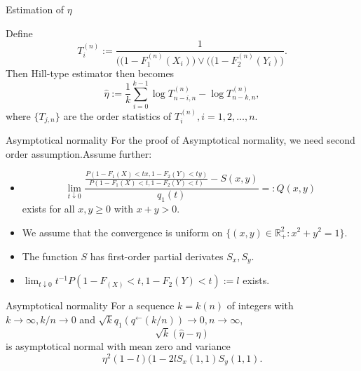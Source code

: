 \documentclass[11pt]{beamer}
\begin{document}
\begin{frame}{Estimation of $\eta$}

Define 
\begin{displaymath}
T_i^{(n)}:=\dfrac{1}{\big( (1-F_1^{(n)}(X_i)\big) \lor \big( (1-F_2^{(n)}(Y_i)\big)}.
\end{displaymath}
Then Hill-type estimator then becomes
\begin{displaymath}
\hat{\eta}:=\frac{1}{k}\sum_{i=0}^{k-1} \log T_{n-i,n}^{(n)}-\log T_{n-k,n}^{(n)},
\end{displaymath}
where $\{T_{j,n}\}$ are the order statistics of $T_i^{(n)}, i=1,2,\dots,n$.
\end{frame}

\begin{frame}{Asymptotical normality}
For the proof of Asymptotical normality, we need second order assumption.Assume further:
\begin{itemize}
\item
\begin{displaymath}
 \lim_{t\downarrow 0} \dfrac{ \frac{P(1-F_1(X)<tx, 1-F_2(Y)<ty)}{P(1-F_1(X)<t, 1-F_2(Y)<t)} -S(x,y)}{q_1(t)}=:Q(x,y)
\end{displaymath}
exists for all $x,y\ge 0$ with $x+y>0$.
\item We assume that the convergence is uniform on $\{ (x,y)\in \mathbb{R}_{+}^2:x^2+y^2=1\}$.
\item The function $S$ has first-order partial derivates $S_x,S_y$.
\item $\lim_{t\downarrow 0}  t^{-1}P(1-F_(X)<t, 1-F_2(Y)<t):=l$ exists.
\end{itemize}
\end{frame}

\begin{frame}{Asymptotical normality}
For a sequence $k=k(n)$ of integers with $k\to \infty,k/n \to 0$ and $\sqrt{k}q_1(q^{\leftarrow}(k/n))\to 0, n\to \infty$,
\begin{displaymath}
\sqrt{k}(\hat{\eta}-\eta)
\end{displaymath}
is asymptotical normal with mean zero and variance
\begin{displaymath}
\eta^2(1-l)(1-2lS_x(1,1)S_y(1,1).
\end{displaymath}
\end{frame}
\end{document}
